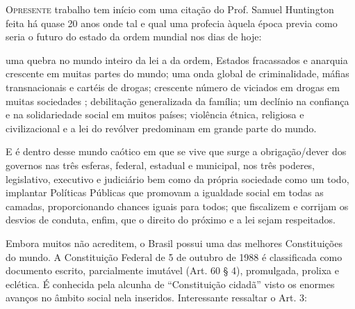 \documentclass[
	12pt,				%
	openright,			%
	twoside,			%
	a4paper,			%
	chapter=TITLE,		%
	section=TITLE,		%
	subsection=TITLE,	%
	subsubsection=TITLE,%
	spanish,            %
	english,			%
	brazil				%
	]{abntex2}
\begin{document}
\lettrine[lines=2, lhang=0.33, loversize=0.25]{O} {presente} trabalho tem início com uma citação do Prof. Samuel Huntington feita há quase 20 anos onde tal e qual uma profecia àquela época previa como seria o futuro do estado da ordem
mundial nos dias de hoje:
\begin{citacao}
    uma quebra no mundo inteiro da lei a da ordem, Estados fracassados e anarquia crescente em muitas
    partes do mundo; uma onda global de criminalidade, máfias transnacionais e cartéis de drogas;
    crescente número de viciados em drogas em muitas sociedades ; debilitação generalizada da família;
    um declínio na confiança e na solidariedade social em muitos países; violência étnica, religiosa e
    civilizacional e a lei do revólver predominam em grande parte do mundo.\cite[p. ~409]{Hunt1997}
\end{citacao}
\par
E é dentro desse mundo caótico em que se vive que surge a obrigação/dever dos governos nas três esferas, federal, estadual e municipal, nos três poderes, legislativo, executivo e judiciário bem como
da própria sociedade como um todo, implantar Políticas Públicas que promovam a igualdade social em todas
as camadas, proporcionando chances iguais para todos; que fiscalizem e corrijam os desvios de conduta,
enfim, que o direito do próximo e a lei sejam respeitados.
\par
Embora muitos não acreditem, o Brasil possui uma das melhores Constituições do mundo. A Constituição
Federal de 5 de outubro de 1988 é classificada como documento escrito, parcialmente imutável (Art. 60 \S
4\textordmasculine), promulgada, prolixa e eclética. É conhecida pela alcunha de “Constituição cidadã”
visto os enormes avanços no âmbito social nela inseridos.%
Interessante ressaltar o Art. 3\textordmasculine : 
\end{document}
